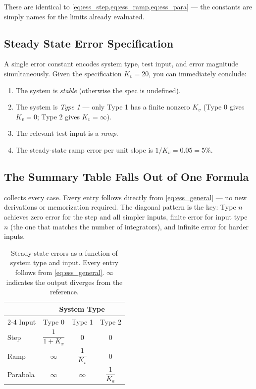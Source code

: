 \documentclass[12pt]{article}
\begin{document}
These are identical to \cref{eq:ess_step,eq:ess_ramp,eq:ess_para} ---
the constants are simply names for the limits already evaluated.

\subsection{Steady State Error Specification}

A single error constant encodes system type, test input, and error magnitude
simultaneously.  Given the specification $K_v = 20$, you can immediately
conclude:
\begin{enumerate}
  \item The system is \emph{stable} (otherwise the spec is undefined).
  \item The system is \emph{Type 1} --- only Type 1 has a finite nonzero $K_v$
    (Type 0 gives $K_v = 0$; Type 2 gives $K_v = \infty$).
  \item The relevant test input is a \emph{ramp}.
  \item The steady-state ramp error per unit slope is $1/K_v = 0.05 = 5\%$.
\end{enumerate}

\subsection{The Summary Table Falls Out of One Formula}

 collects every case.  Every entry follows directly from
\cref{eq:ess_general} --- no new derivations or memorization required.  The
diagonal pattern is the key: Type $n$ achieves zero error for the step and all
simpler inputs, finite error for input type $n$ (the one that matches the
number of integrators), and infinite error for harder inputs.

\begin{table}[htbp]
\centering
\caption{Steady-state errors as a function of system type and input.  Every
  entry follows from \cref{eq:ess_general}.  $\infty$ indicates the output
  diverges from the reference.}
\label{tab:sse_summary}
\begin{tabular}{lccc}
\toprule
 & \multicolumn{3}{c}{System Type} \\
\cmidrule(lr){2-4}
Input    & Type 0              & Type 1              & Type 2 \\
\midrule
Step     & $\dfrac{1}{1+K_x}$ & $0$                 & $0$    \\[10pt]
Ramp     & $\infty$            & $\dfrac{1}{K_v}$   & $0$    \\[10pt]
Parabola & $\infty$            & $\infty$            & $\dfrac{1}{K_a}$ \\[10pt]
\bottomrule
\end{tabular}
\end{table}
\end{document}
